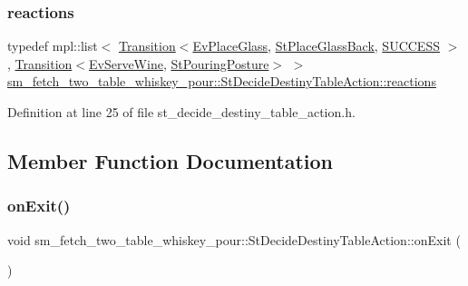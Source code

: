 \subsubsection{\texorpdfstring{reactions}{reactions}}
{\footnotesize\ttfamily typedef mpl\+::list$<$ \hyperlink{classsmacc_1_1Transition}{Transition}$<$\hyperlink{structsm__fetch__two__table__whiskey__pour_1_1EvPlaceGlass}{Ev\+Place\+Glass}, \hyperlink{structsm__fetch__two__table__whiskey__pour_1_1StPlaceGlassBack}{St\+Place\+Glass\+Back}, \hyperlink{structsmacc_1_1default__transition__tags_1_1SUCCESS}{S\+U\+C\+C\+E\+SS} $>$, \hyperlink{classsmacc_1_1Transition}{Transition}$<$\hyperlink{structsm__fetch__two__table__whiskey__pour_1_1EvServeWine}{Ev\+Serve\+Wine}, \hyperlink{structsm__fetch__two__table__whiskey__pour_1_1StPouringPosture}{St\+Pouring\+Posture}$>$ $>$ \hyperlink{structsm__fetch__two__table__whiskey__pour_1_1StDecideDestinyTableAction_a34401c5a7f88b98f4d85e274dc26de4b}{sm\+\_\+fetch\+\_\+two\+\_\+table\+\_\+whiskey\+\_\+pour\+::\+St\+Decide\+Destiny\+Table\+Action\+::reactions}}



Definition at line 25 of file st\+\_\+decide\+\_\+destiny\+\_\+table\+\_\+action.\+h.



\subsection{Member Function Documentation}
\mbox{\label{structsm__fetch__two__table__whiskey__pour_1_1StDecideDestinyTableAction_a088ea012849bd31e47f417af511efcdb}} 
\subsubsection{\texorpdfstring{on\+Exit()}{onExit()}}
{\footnotesize\ttfamily void sm\+\_\+fetch\+\_\+two\+\_\+table\+\_\+whiskey\+\_\+pour\+::\+St\+Decide\+Destiny\+Table\+Action\+::on\+Exit (\begin{DoxyParamCaption}\item[{\hyperlink{structsmacc_1_1default__transition__tags_1_1SUCCESS}{S\+U\+C\+C\+E\+SS}}]{ }\end{DoxyParamCaption})\hspace{0.3cm}{\ttfamily [inline]}}




